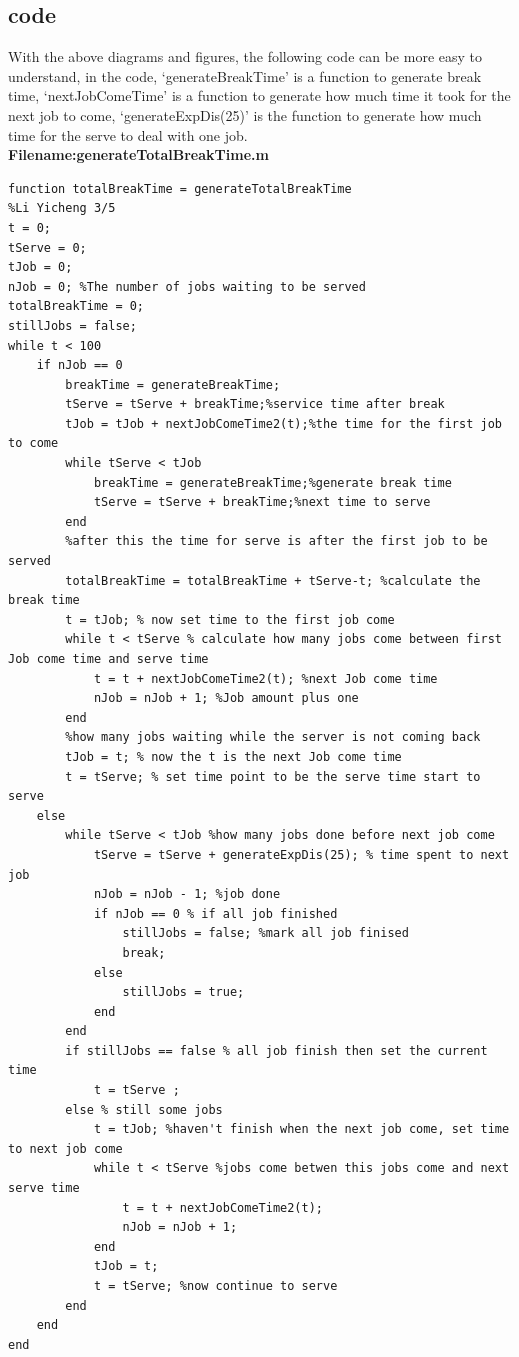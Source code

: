 \documentclass[twoside]{article}
\begin{document}
\subsection{\normalsize{code}}
With the above diagrams and figures, the following code can be more easy to understand, in the code, `generateBreakTime' is a function to generate break time, `nextJobComeTime' is a function to generate how much time it took for the next job to come, `generateExpDis(25)' is the function to generate how much time for the serve to deal with one job.
\noindent \textbf {Filename:generateTotalBreakTime.m} 
\begin{lstlisting}
function totalBreakTime = generateTotalBreakTime
%Li Yicheng 3/5
t = 0;
tServe = 0;
tJob = 0;
nJob = 0; %The number of jobs waiting to be served
totalBreakTime = 0;
stillJobs = false;
while t < 100
    if nJob == 0
        breakTime = generateBreakTime;
        tServe = tServe + breakTime;%service time after break
        tJob = tJob + nextJobComeTime2(t);%the time for the first job to come
        while tServe < tJob
            breakTime = generateBreakTime;%generate break time 
            tServe = tServe + breakTime;%next time to serve
        end
        %after this the time for serve is after the first job to be served
        totalBreakTime = totalBreakTime + tServe-t; %calculate the break time 
        t = tJob; % now set time to the first job come
        while t < tServe % calculate how many jobs come between first Job come time and serve time
            t = t + nextJobComeTime2(t); %next Job come time 
            nJob = nJob + 1; %Job amount plus one
        end
        %how many jobs waiting while the server is not coming back
        tJob = t; % now the t is the next Job come time
        t = tServe; % set time point to be the serve time start to serve
    else
        while tServe < tJob %how many jobs done before next job come
            tServe = tServe + generateExpDis(25); % time spent to next job
            nJob = nJob - 1; %job done
            if nJob == 0 % if all job finished
                stillJobs = false; %mark all job finised
                break;
            else
                stillJobs = true;
            end
        end
        if stillJobs == false % all job finish then set the current time 
            t = tServe ; 
        else % still some jobs
            t = tJob; %haven't finish when the next job come, set time to next job come
            while t < tServe %jobs come betwen this jobs come and next serve time
                t = t + nextJobComeTime2(t);
                nJob = nJob + 1;
            end
            tJob = t;
            t = tServe; %now continue to serve 
        end
    end
end

\end{lstlisting}
\end{document}
